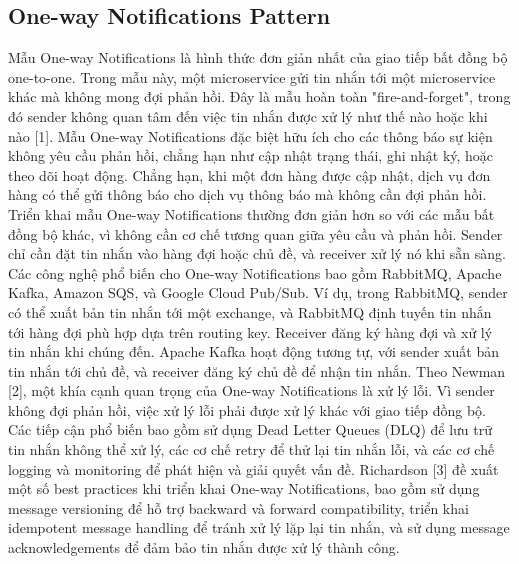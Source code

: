 \subsection{One-way Notifications Pattern}
Mẫu One-way Notifications là hình thức đơn giản nhất của giao tiếp bất đồng bộ one-to-one. Trong mẫu này, một microservice gửi tin nhắn tới một microservice khác mà không mong đợi phản hồi. Đây là mẫu hoàn toàn "fire-and-forget", trong đó sender không quan tâm đến việc tin nhắn được xử lý như thế nào hoặc khi nào [1].
Mẫu One-way Notifications đặc biệt hữu ích cho các thông báo sự kiện không yêu cầu phản hồi, chẳng hạn như cập nhật trạng thái, ghi nhật ký, hoặc theo dõi hoạt động. Chẳng hạn, khi một đơn hàng được cập nhật, dịch vụ đơn hàng có thể gửi thông báo cho dịch vụ thông báo mà không cần đợi phản hồi.
Triển khai mẫu One-way Notifications thường đơn giản hơn so với các mẫu bất đồng bộ khác, vì không cần cơ chế tương quan giữa yêu cầu và phản hồi. Sender chỉ cần đặt tin nhắn vào hàng đợi hoặc chủ đề, và receiver xử lý nó khi sẵn sàng.
Các công nghệ phổ biến cho One-way Notifications bao gồm RabbitMQ, Apache Kafka, Amazon SQS, và Google Cloud Pub/Sub. Ví dụ, trong RabbitMQ, sender có thể xuất bản tin nhắn tới một exchange, và RabbitMQ định tuyến tin nhắn tới hàng đợi phù hợp dựa trên routing key. Receiver đăng ký hàng đợi và xử lý tin nhắn khi chúng đến. Apache Kafka hoạt động tương tự, với sender xuất bản tin nhắn tới chủ đề, và receiver đăng ký chủ đề để nhận tin nhắn.
Theo Newman [2], một khía cạnh quan trọng của One-way Notifications là xử lý lỗi. Vì sender không đợi phản hồi, việc xử lý lỗi phải được xử lý khác với giao tiếp đồng bộ. Các tiếp cận phổ biến bao gồm sử dụng Dead Letter Queues (DLQ) để lưu trữ tin nhắn không thể xử lý, các cơ chế retry để thử lại tin nhắn lỗi, và các cơ chế logging và monitoring để phát hiện và giải quyết vấn đề.
Richardson [3] đề xuất một số best practices khi triển khai One-way Notifications, bao gồm sử dụng message versioning để hỗ trợ backward và forward compatibility, triển khai idempotent message handling để tránh xử lý lặp lại tin nhắn, và sử dụng message acknowledgements để đảm bảo tin nhắn được xử lý thành công.

